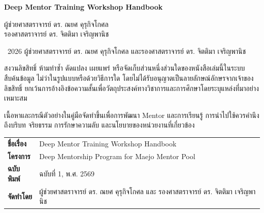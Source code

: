 \thispagestyle{empty}
\vspace*{\fill}

{\Large\bfseries\color{BlueprintNavy}Deep Mentor Training Workshop Handbook\par}
\vspace{5mm}
\begin{minipage}{118mm}
\raggedright\large
ผู้ช่วยศาสตราจารย์ ดร. ณยศ คุรุกิจโกศล\\
รองศาสตราจารย์ ดร. จิตติมา เจริญพานิช
\end{minipage}\par

\vspace{12mm}
\noindent\textcopyright\ 2026 ผู้ช่วยศาสตราจารย์ ดร. ณยศ คุรุกิจโกศล และรองศาสตราจารย์ ดร. จิตติมา เจริญพานิช

\vspace{4mm}
\noindent สงวนลิขสิทธิ์ ห้ามทำซ้ำ ดัดแปลง เผยแพร่ หรือจัดเก็บส่วนหนึ่งส่วนใดของหนังสือเล่มนี้ในระบบสืบค้นข้อมูล ไม่ว่าในรูปแบบหรือด้วยวิธีการใด โดยไม่ได้รับอนุญาตเป็นลายลักษณ์อักษรจากเจ้าของลิขสิทธิ์ ยกเว้นการอ้างอิงข้อความสั้นเพื่อวัตถุประสงค์ทางวิชาการและการศึกษาโดยระบุแหล่งที่มาอย่างเหมาะสม

\vspace{4mm}
\noindent เนื้อหาและกรณีตัวอย่างในคู่มือจัดทำขึ้นเพื่อการพัฒนา Mentor และการเรียนรู้ การนำไปใช้ควรคำนึงถึงบริบท จริยธรรม การรักษาความลับ และนโยบายของหน่วยงานที่เกี่ยวข้อง

\vspace{10mm}
\begin{tabular}{@{}ll@{}}
\textbf{ชื่อเรื่อง} & Deep Mentor Training Workshop Handbook\\
\textbf{โครงการ} & Deep Mentorship Program for Maejo Mentor Pool\\
\textbf{ฉบับพิมพ์} & ฉบับที่ 1, พ.ศ. 2569\\
\textbf{จัดทำโดย} & ผู้ช่วยศาสตราจารย์ ดร. ณยศ คุรุกิจโกศล และ รองศาสตราจารย์ ดร. จิตติมา เจริญพานิช\\
\end{tabular}

\vspace*{\fill}
\clearpage

